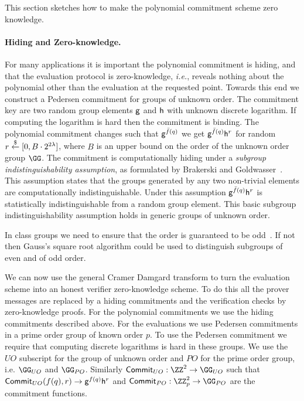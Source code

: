 This section sketches how to make the polynomial commitment scheme zero knowledge. 

\paragraph{Hiding and Zero-knowledge.} For many applications it is important the polynomial commitment is hiding, and that the evaluation protocol is zero-knowledge, \emph{i.e.}, reveals nothing about the polynomial other than the evaluation at the requested point.
Towards this end we construct a Pedersen commitment for groups of unknown order.
The commitment key are two random group elements $\mathsf{g}$ and $\mathsf{h}$ with unknown discrete logarithm. If computing the logarithm is hard then the commitment is binding.
 The polynomial commitment changes such that $\mathsf{g}^{\bar{f}(q)}$ we get $\mathsf{g}^{\bar{f}(q)}\mathsf{h}^{r}$ for random $r \overset{\$}{\gets} [0, B\cdot 2^{2\lambda}]$, where $B$ is an upper bound on the order of the unknown order group $\GG$.  
The commitment is computationally hiding under a \emph{subgroup indistinguishability assumption}, as formulated by Brakerski and Goldwasser~\cite{C:BraGol10}. This assumption states that the groups generated by any two non-trivial elements are computationally indistinguishable. Under this assumption $\mathsf{g}^{\bar{f}(q)}\mathsf{h}^r$ is statistically indistinguishable from a random group element.
This basic subgroup indistinguishability assumption holds in generic groups of unknown order. 

In class groups we need to ensure that the order is guaranteed to be odd~\cite{PKC/BucHam01}. If not then Gauss's square root algorithm could be used to distinguish subgroups of even and of odd order.

We can now use the general Cramer Damgard\cite{C:CraDam98} transform to turn the evaluation scheme into an honest verifier zero-knowledge scheme.  
To do this all the prover messages are replaced by a hiding commitments and the verification checks by zero-knowledge proofs. For the polynomial commitments we use the hiding commitments described above. For the evaluations we use Pedersen commitments\cite{C:Pedersen91} in a prime order group of known order $p$. To use the Pedersen commitment we require that computing discrete logarithms is hard in these groups. 
We use the ${UO}$ subscript for the group of unknown order and $PO$ for the prime order group, i.e. $\GG_{UO}$ and $\GG_{PO}$.
Similarly $\commit_{UO}:\ZZ^2 \rightarrow\GG_{UO}$ such that $\textsf{{Commit}}_{UO}(f(q),r )\rightarrow \mathsf{g}^{f(q)}\mathsf{h}^{r}$ and $\commit_{PO}:\ZZ_p^2\rightarrow \GG_{PO}$ are the commitment functions.

